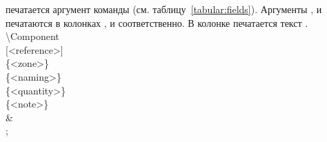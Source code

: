 \begin{tikztablex}
{ печатается аргумент команды
(см. таблицу~\ref{tabular:fields}). Аргументы
,  и  печатаются в колонках
,  и
 соответственно. В колонке
 печатается текст .\\
{\textbackslash{}Component\\[0pt][<reference>]\\
\{<zone>\}\\
\{<naming>\}\\
\{<quantity>\}\\
\{<note>\}\\}
&\\
};
\end{tikztablex}

\clearpage
